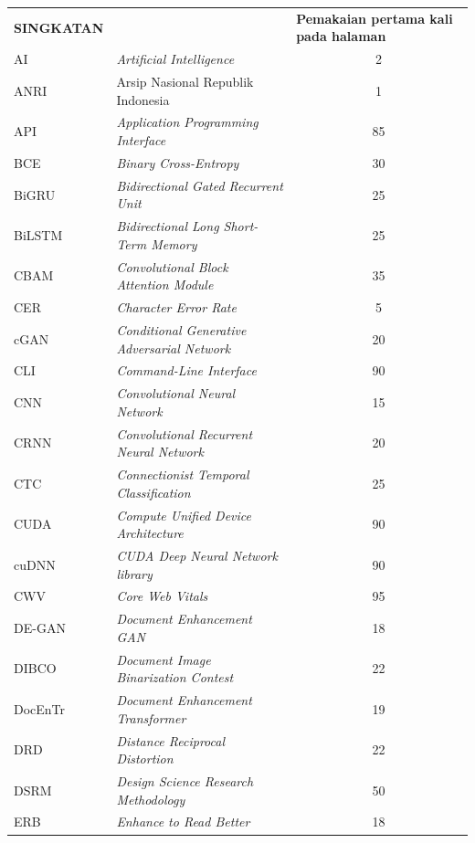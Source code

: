 \begin{longtable}{@{} l >{\raggedright\arraybackslash}p{7.5cm} c @{}}
\multicolumn{1}{l}{\textbf{SINGKATAN}} & \multicolumn{1}{l}{\textbf{Nama}} & \multicolumn{1}{l}{\parbox[c]{3.5cm}{\raggedright \textbf{Pemakaian pertama kali pada halaman}}} \\


AI & \textit{Artificial Intelligence} & 2 \\
ANRI & Arsip Nasional Republik Indonesia & 1 \\
API & \textit{Application Programming Interface} & 85 \\
BCE & \textit{Binary Cross-Entropy} & 30 \\
BiGRU & \textit{Bidirectional Gated Recurrent Unit} & 25 \\
BiLSTM & \textit{Bidirectional Long Short-Term Memory} & 25 \\
CBAM & \textit{Convolutional Block Attention Module} & 35 \\
CER & \textit{Character Error Rate} & 5 \\
cGAN & \textit{Conditional Generative Adversarial Network} & 20 \\
CLI & \textit{Command-Line Interface} & 90 \\
CNN & \textit{Convolutional Neural Network} & 15 \\
CRNN & \textit{Convolutional Recurrent Neural Network} & 20 \\
CTC & \textit{Connectionist Temporal Classification} & 25 \\
CUDA & \textit{Compute Unified Device Architecture} & 90 \\
cuDNN & \textit{CUDA Deep Neural Network library} & 90 \\
CWV & \textit{Core Web Vitals} & 95 \\
DE-GAN & \textit{Document Enhancement GAN} & 18 \\
DIBCO & \textit{Document Image Binarization Contest} & 22 \\
DocEnTr & \textit{Document Enhancement Transformer} & 19 \\
DRD & \textit{Distance Reciprocal Distortion} & 22 \\
DSRM & \textit{Design Science Research Methodology} & 50 \\
ERB & \textit{Enhance to Read Better} & 18 \\

\end{longtable}
